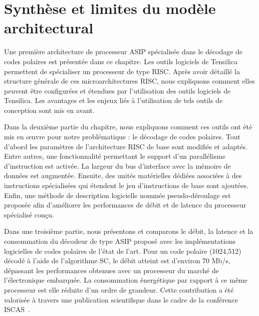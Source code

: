 \section{Synthèse et limites du modèle architectural}
\label{sec:tensilica_conclu}
Une première architecture de processeur ASIP spécialisée dans le décodage de codes polaires est présentée dans ce chapitre. Les outils logiciels de Tensilica permettent de spécialiser un processeur de type RISC. Après avoir détaillé la structure générale de ces microarchitectures RISC, nous expliquons comment elles peuvent être configurées et étendues par l'utilisation des outils logiciels de Tensilica. Les avantages et les enjeux liés à l'utilisation de tels outils de conception sont mis en avant.

Dans la deuxième partie du chapitre, nous expliquons comment ces outils ont été mis en œuvre pour notre problématique : le décodage de codes polaires. Tout d'abord les paramètres de l'architecture RISC de base sont modifiés et adaptés. Entre autres, une fonctionnalité permettant le support d'un parallélisme d'instruction est activée. La largeur du bus d'interface avec la mémoire de données est augmentée. Ensuite, des unités matérielles dédiées associées à des instructions spécialisées qui étendent le jeu d'instructions de base sont ajoutées. Enfin, une méthode de description logicielle nommée \og pseudo-déroulage \fg est proposée afin d'améliorer les performances de débit et de latence du processeur spécialisé conçu.

Dans une troisième partie, nous présentons et comparons le débit, la latence et la consommation du décodeur de type ASIP proposé avec les implémentations logicielles de codes polaires de l'état de l'art. Pour un code polaire (1024,512) décodé à l'aide de l'algorithme SC, le débit atteint est d'environ 70 Mb/s, dépassant les performances obtenues avec un processeur du marché de l'électronique embarquée. La consommation énergétique par rapport à ce même processeur est elle réduite d'un ordre de grandeur.
Cette contribution a été valorisée à travers une publication scientifique dans le cadre de la conférence ISCAS~.

